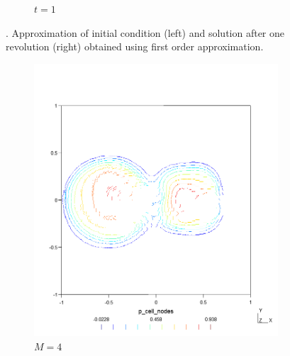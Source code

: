 \begin{figure}[h!]
\begin{subfigure}{.5\textwidth}
        \caption{$t = 1$}
    \end{subfigure}
    \caption{.  Approximation of initial condition (left) and
    solution after one revolution (right) obtained using first order approximation.}
    \label{fig:sol_3D_adv2D}
\end{figure}

\begin{figure}[p!]
    \centering
    \begin{subfigure}{.5\textwidth}
        \centering
        \includegraphics[width=\linewidth]{../figs/sols/kriv-sol-h2304o04}
        \caption{$M=4$}
    \end{subfigure}%
    \begin{subfigure}{.5\textwidth}
        \centering

\end{subfigure}
\end{figure}
